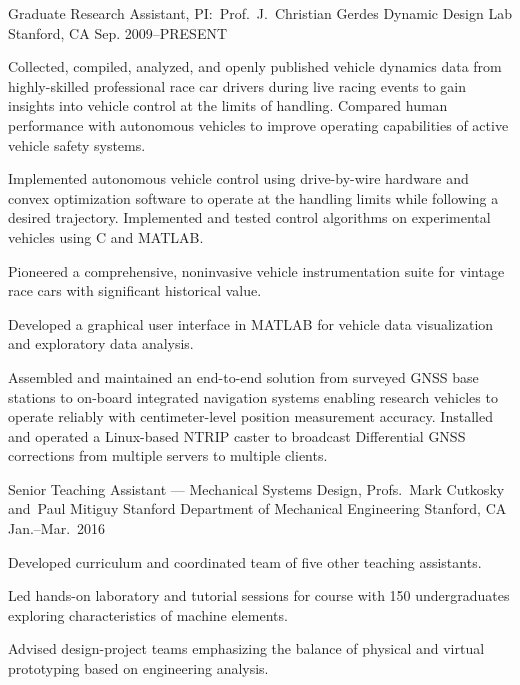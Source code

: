 \begin{cventries}
  \cventry%
    {Graduate Research Assistant, PI:\ Prof.~J.~Christian Gerdes}
    {Dynamic Design Lab}
    {Stanford, CA}
    {Sep. 2009--PRESENT}
    {
      \begin{cvitems}
        \item{Collected, compiled, analyzed, and openly published vehicle dynamics data from highly-skilled professional race car drivers during live racing events to gain insights into vehicle control at the limits of handling. Compared human performance with autonomous vehicles to improve operating capabilities of active vehicle safety systems.}
        \item{Implemented autonomous vehicle control using drive-by-wire hardware and convex optimization software to operate at the handling limits while following a desired trajectory. Implemented and tested control algorithms on experimental vehicles using C and MATLAB.}
        \item{Pioneered a comprehensive, noninvasive vehicle instrumentation suite for vintage race cars with significant historical value.}
        \item{Developed a graphical user interface in MATLAB for vehicle data visualization and exploratory data analysis.}
        \item{Assembled and maintained an end-to-end solution from surveyed GNSS base stations to on-board integrated navigation systems enabling research vehicles to operate reliably with centimeter-level position measurement accuracy. Installed and operated a Linux-based NTRIP caster to broadcast Differential GNSS corrections from multiple servers to multiple clients.}
      \end{cvitems}
    }

  \cventry%
    {Senior Teaching Assistant --- Mechanical Systems Design, Profs.~Mark Cutkosky and~Paul Mitiguy}
    {Stanford Department of Mechanical Engineering}
    {Stanford, CA}
    {Jan.--Mar.\ 2016}
    {
      \begin{cvitems}
        \item{Developed curriculum and coordinated team of five other teaching assistants.}
        \item{Led hands-on laboratory and tutorial sessions for course with 150 undergraduates exploring characteristics of machine elements.}
        \item{Advised design-project teams emphasizing the balance of physical and virtual prototyping based on engineering analysis.}
      \end{cvitems}
    }
\end{cventries}
